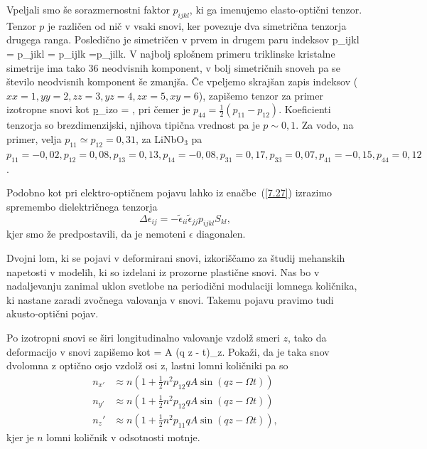 Vpeljali smo še sorazmernostni faktor
$p_{ijkl}$, ki ga imenujemo elasto-optični tenzor. 
Tenzor $p$ je različen od nič v vsaki snovi, ker povezuje dva simetrična tenzorja 
drugega ranga. Posledično je simetričen v prvem in drugem paru indeksov
\beq
p_{ijkl} = p_{jikl} = p_{ijlk} =p_{jilk}.
\eeq
V najbolj splošnem primeru triklinske kristalne simetrije 
ima tako 36 neodvisnih komponent, v bolj simetričnih snoveh pa se število 
neodvisnih komponent še zmanjša. Če vpeljemo skrajšan zapis indeksov ($xx = 1,
yy=2, zz = 3, yz = 4, zx = 5, xy = 6$), zapišemo tenzor za primer izotropne snovi kot
\beq
\underline{p}_{\textrm{izo}} = 
,
\label{tenzorp}
\eeq
pri čemer je $p_{44}= \frac{1}{2}(p_{11}-p_{12})$. Koeficienti tenzorja so 
brezdimenzijski, njihova tipična vrednost pa je $p\sim0,1$. Za vodo, na primer, 
velja $p_{11} \simeq p_{12} = 0,31$, za LiNbO$_3$ pa $p_{11} = -0,02, 
p_{12} = 0,08, p_{13} = 0,13,  p_{14} = -0,08, p_{31} = 0,17, p_{33} = 0,07,
p_{41} = -0,15, p_{44} = 0,12$.

Podobno kot pri elektro-optičnem pojavu lahko iz enačbe~(\ref{7.27}) izrazimo
spremembo dielektričnega tenzorja 
\begin{equation}
\Delta\epsilon_{ij}=-\tilde{\epsilon}_{ii}\tilde{\epsilon}_{jj}p_{ijkl}S_{kl},
\label{7.29}
\end{equation}
kjer smo že predpostavili, da je nemoteni $\epsilon$ diagonalen. 

Dvojni lom, ki se pojavi v deformirani snovi, izkoriščamo za študij
mehanskih napetosti v modelih, ki so izdelani iz prozorne plastične
snovi. Nas bo v nadaljevanju zanimal uklon svetlobe na periodični
modulaciji lomnega količnika, ki nastane zaradi zvočnega valovanja v snovi. Takemu pojavu
pravimo tudi akusto-optični pojav.

\begin{definition}
Po izotropni snovi se širi longitudinalno valovanje vzdolž smeri $z$, tako da 
deformacijo v snovi zapišemo kot
\beq
{} = A \cos(q z - \Omega t)_z.
\eeq
Pokaži, da je taka snov dvolomna z optično osjo vzdolž osi z, lastni 
lomni količniki pa so 
\begin{align}
n_{x'} &\approx n(1+\frac{1}{2}n^2p_{12}q A \sin (q z - \Omega t))\\
n_{y'} &\approx n(1+\frac{1}{2}n^2p_{12}q A \sin (q z - \Omega t))\\
n_z' &\approx n(1+\frac{1}{2}n^2p_{11}q A \sin (q z - \Omega t)),
\end{align}
kjer je $n$ lomni količnik v odsotnosti motnje.
\end{definition}

